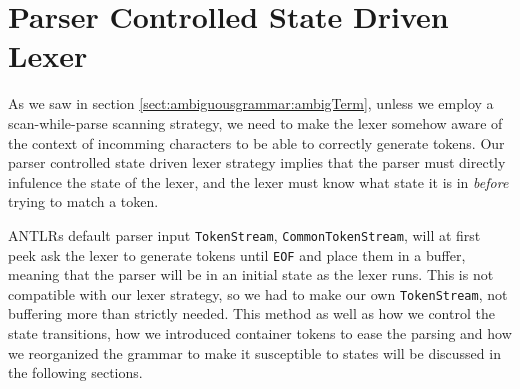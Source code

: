 \section{Parser Controlled State Driven Lexer}
As we saw in section \ref{sect:ambiguousgrammar:ambigTerm}, unless we employ a scan-while-parse scanning strategy, we need to make the lexer somehow aware of the context of incomming characters to be able to correctly generate tokens. Our parser controlled state driven lexer strategy implies that the parser must directly infulence the state of the lexer, and the lexer must know what state it is in \emph{before} trying to match a token. 

ANTLRs default parser input \verb!TokenStream!, \verb!CommonTokenStream!, will at first peek ask the lexer to generate tokens until \verb!EOF! and place them in a buffer, meaning that the parser will be in an initial state as the lexer runs. This is not compatible with our lexer strategy, so we had to make our own \verb!TokenStream!, not buffering more than strictly needed. This method as well as how we control the state transitions, how we introduced container tokens to ease the parsing and how we reorganized the grammar to make it susceptible to states will be discussed in the following sections.

